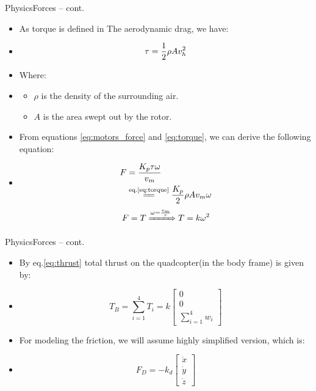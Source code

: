 \documentclass[8pt]{beamer}
\newcommand{\Ytri}{$\triangleright$ }
\renewcommand{\|}[1][.3em]{\hspace{#1}|\hspace{#1}}
\renewcommand{\,}[1][.3em]{,\hspace{#1}}
\newcommand{\subitem}{\item[\Ytri]}
\begin{document}
\begin{frame}{Physics}{Forces -- cont.}
    \begin{itemize}
    \item As torque is defined in The aerodynamic drag, we have:
    \item[] \begin{equation}
    \tau = {1 \over 2}{\rho}Av_{h}^2
    \label{eq:torque}
    \end{equation}
    \pause
    \item Where:
    \item[] \begin{itemize}
        \subitem $\rho$ is the density of the surrounding air.
        \subitem $A$ is the area swept out by the rotor.
    \end{itemize}
    \pause
    \item From equations \ref{eq:motors_force} and \ref{eq:torque}, we can derive the following equation:
    \item[] \begin{align*}
    F &= { K_p\tau\omega \over v_m}\\
      &\stackrel{\text{eq.\ref{eq:torque}}}{=\joinrel=} {K_p \over 2}{\rho}Av_{m}\omega
    \end{align*}
    \pause
    \begin{equation}
    F = T \xRightarrow{\omega = {v_m \over r}} T = k\omega^2
    \label{eq:thrust}
    \end{equation}
    \end{itemize}
\end{frame}

\begin{frame}{Physics}{Forces -- cont.}
    \begin{itemize}
    \item By eq.\ref{eq:thrust} total thrust on the quadcopter(in the body frame) is given by:
    \item[] \begin{equation}
    T_B = \sum_{i = 1}^4 T_i = k\begin{bmatrix}
    0\\0\\\sum_{i = 1}^4w_i
    \end{bmatrix}
    \end{equation}
    \pause
    \item For modeling the friction, we will assume highly simplified version, which is:
    \item[] \begin{equation}
    F_D = -k_d\begin{bmatrix}
    \dot{x}\\\dot{y}\\\dot{z}
    \end{bmatrix}     
    \end{equation}
    \end{itemize}
\end{frame}
\end{document}
